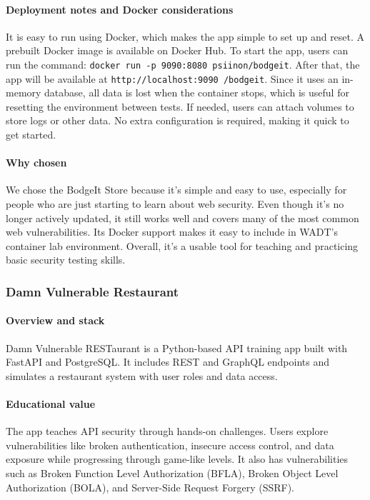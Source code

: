 \documentclass[12pt]{article}
\begin{document}
\paragraph{Deployment notes and Docker considerations}
It is easy to run using Docker, which makes the app simple to set up and reset. A prebuilt Docker image is available on Docker Hub. To start the app, users can run the command: \texttt{docker run -p 9090:8080 psiinon/bodgeit}. After that, the app will be available at \texttt{http://localhost:9090
/bodgeit}. Since it uses an in-memory database, all data is lost when the container stops, which is useful for resetting the environment between tests. If needed, users can attach volumes to store logs or other data. No extra configuration is required, making it quick to get started.

\paragraph{Why chosen}
We chose the BodgeIt Store because it’s simple and easy to use, especially for people who are just starting to learn about web security. Even though it’s no longer actively updated, it still works well and covers many of the most common web vulnerabilities. Its Docker support makes it easy to include in WADT’s container lab environment. Overall, it’s a usable tool for teaching and practicing basic security testing skills.

\subsubsection{Damn Vulnerable Restaurant}

\paragraph{Overview and stack}
Damn Vulnerable RESTaurant is a Python-based API training app built with FastAPI and PostgreSQL. It includes REST and GraphQL endpoints and simulates a restaurant system with user roles and data access.

\paragraph{Educational value}
The app teaches API security through hands-on challenges. Users explore vulnerabilities like broken authentication, insecure access control, and data exposure while progressing through game-like levels. It also has vulnerabilities such as Broken Function Level Authorization (BFLA), Broken Object Level Authorization (BOLA), and Server-Side Request Forgery (SSRF).
\end{document}
